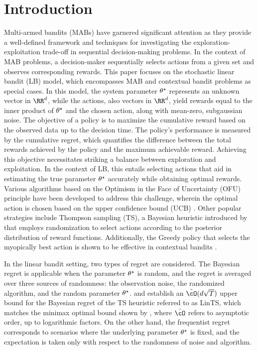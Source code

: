 \section{Introduction}




Multi-armed bandits (MABs) have garnered significant attention as they provide a well-defined framework and techniques for investigating the exploration-exploitation trade-off in sequential decision-making problems. In the context of MAB problems, a decision-maker sequentially selects actions from a given set and observes corresponding rewards. This paper focuses on the stochastic linear bandit (LB) model, which encompasses MAB and contextual bandit problems as special cases. In this model, the system parameter $\theta^\star$ represents an unknown vector in $\RR^d$, while the actions, also vectors in $\RR^d$, yield rewards equal to the inner product of $\theta^\star$ and the chosen action, along with mean-zero, subgaussian noise.
	The objective of a policy is to maximize the cumulative reward based on the observed data up to the decision time. The policy's performance is measured by the cumulative regret, which quantifies the difference between the total rewards achieved by the policy and the maximum achievable reward. Achieving this objective necessitates striking a balance between exploration and exploitation. In the context of LB, this entails selecting actions that aid in estimating the true parameter $\theta^\star$ accurately while obtaining optimal rewards. Various algorithms based on the Optimism in the Face of Uncertainty (OFU) principle have been developed to address this challenge, wherein the optimal action is chosen based on the upper confidence bound (UCB) \citep{lai1985asymptotically}. Other popular strategies include Thompson sampling (TS), a Bayesian heuristic introduced by \cite{thompson1933likelihood} that employs randomization to select actions according to the posterior distribution of reward functions. Additionally, the Greedy policy that selects the myopically best action  is shown to be effective in contextual bandits \citep{kannan2018smoothed,raghavan2018externalities,hao2020adaptive, bastani2021mostly}.

In the linear bandit setting, two types of regret are considered. The Bayesian regret is applicable when the parameter $\theta^\star$ is random, and the regret is averaged over three sources of randomness: the observation noise, the randomized algorithm, and the random parameter $\theta^\star$. \cite{russo2014learning} and \cite{dong2018information} establish an $\tilde{\cO}(d \sqrt{T})$ upper bound for the Bayesian regret of the TS heuristic referred to as LinTS, which matches the minimax optimal bound shown by \cite{dani2008stochastic}, where $\tilde{\cO}$ refers to asymptotic order, up to logarithmic factors. On the other hand, the frequentist regret corresponds to scenarios where the underlying parameter $\theta^\star$ is fixed, and the expectation is taken only with respect to the randomness of noise and algorithm. %

